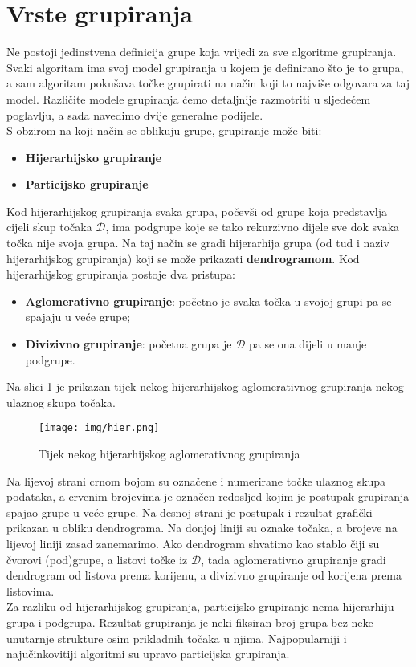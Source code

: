\documentclass[times, utf8, zavrsni]{fer}
\begin{document}
\section{Vrste grupiranja}
\label{vrstegrupiranja}
Ne postoji jedinstvena definicija grupe koja vrijedi za sve algoritme grupiranja. Svaki algoritam ima svoj model grupiranja u kojem je definirano što je to grupa, a sam algoritam pokušava točke grupirati na način koji to najviše odgovara za taj model. Različite modele grupiranja ćemo detaljnije razmotriti u sljedećem poglavlju, a sada navedimo dvije generalne podijele.\\
S obzirom na koji način se oblikuju grupe, grupiranje može biti:
\begin{itemize}
    \item \textbf{Hijerarhijsko grupiranje}
    \item \textbf{Particijsko grupiranje}
\end{itemize}
Kod hijerarhijskog grupiranja svaka grupa, počevši od grupe koja predstavlja cijeli skup točaka $\mathcal{D}$, ima podgrupe koje se tako rekurzivno dijele sve dok svaka točka nije svoja grupa. Na taj način se gradi hijerarhija grupa (od tud i naziv hijerarhijskog grupiranja) koji se može prikazati \textbf{dendrogramom}. Kod hijerarhijskog grupiranja postoje dva pristupa:
\begin{itemize}
    \item \textbf{Aglomerativno grupiranje}: početno je svaka točka u svojoj grupi pa se spajaju u veće grupe;
    \item \textbf{Divizivno grupiranje}: početna grupa je $\mathcal{D}$ pa se ona dijeli u manje podgrupe.
\end{itemize}
Na slici \ref{fig:hier_clustering} je prikazan tijek nekog hijerarhijskog aglomerativnog grupiranja nekog ulaznog skupa točaka.
\begin{figure}[H]
    \centering
    \texttt{[image: img/hier.png]}
    \caption{Tijek nekog hijerarhijskog aglomerativnog grupiranja}
    \label{fig:hier_clustering}
\end{figure}
Na lijevoj strani crnom bojom su označene i numerirane točke ulaznog skupa podataka, a crvenim brojevima je označen redosljed kojim je postupak grupiranja spajao grupe u veće grupe. Na desnoj strani je postupak i rezultat grafički prikazan u obliku dendrograma. Na donjoj liniji su oznake točaka, a brojeve na lijevoj liniji zasad zanemarimo. Ako dendrogram shvatimo kao stablo čiji su čvorovi (pod)grupe, a listovi točke iz $\mathcal{D}$, tada aglomerativno grupiranje gradi dendrogram od listova prema korijenu, a divizivno grupiranje od korijena prema listovima.\\
Za razliku od hijerarhijskog grupiranja, particijsko grupiranje nema hijerarhiju grupa i podgrupa. Rezultat grupiranja je neki fiksiran broj grupa bez neke unutarnje strukture osim prikladnih točaka u njima. Najpopularniji i najučinkovitiji algoritmi su upravo particijska grupiranja.
\end{document}
